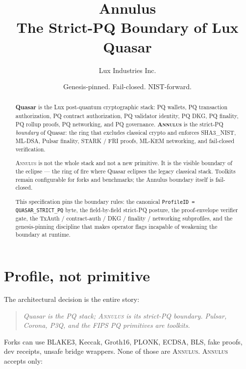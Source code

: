 \documentclass[11pt,a4paper]{article}
\title{Annulus\\
       \large The Strict-PQ Boundary of Lux Quasar}
\author{Lux Industries Inc.}
\date{Genesis-pinned. Fail-closed. NIST-forward.}
\newcommand{\Annulus}{\textsc{Annulus}}
\newcommand{\PQ}{\textsf{PQ}}
\begin{document}
\maketitle

\begin{abstract}
\textbf{Quasar} is the Lux post-quantum cryptographic stack:
\PQ{} wallets, \PQ{} transaction authorization, \PQ{} contract
authorization, \PQ{} validator identity, \PQ{} DKG, \PQ{} finality,
\PQ{} rollup proofs, \PQ{} networking, and \PQ{} governance.
\textbf{\Annulus{}} is the strict-PQ \emph{boundary} of Quasar:
the ring that excludes classical crypto and enforces SHA3\_NIST,
ML-DSA, Pulsar finality, STARK / FRI proofs, ML-KEM networking,
and fail-closed verification.

\Annulus{} is not the whole stack and not a new primitive. It is
the visible boundary of the eclipse --- the ring of fire where
Quasar eclipses the legacy classical stack. Toolkits remain
configurable for forks and benchmarks; the Annulus boundary
itself is fail-closed.

This specification pins the boundary rules: the canonical
\texttt{ProfileID = QUASAR\_STRICT\_PQ} byte, the field-by-field
strict-PQ posture, the proof-envelope verifier gate, the
TxAuth / contract-auth / DKG / finality / networking subprofiles,
and the genesis-pinning discipline that makes operator flags
incapable of weakening the boundary at runtime.
\end{abstract}

\tableofcontents

\section{Profile, not primitive}
\label{sec:profile}

The architectural decision is the entire story:

\begin{quote}
\emph{Quasar is the PQ stack; \Annulus{} is its strict-PQ
boundary. Pulsar, Corona, P3Q, and the FIPS PQ primitives are
toolkits.}
\end{quote}

Forks can use BLAKE3, Keccak, Groth16, PLONK, ECDSA, BLS, fake
proofs, dev receipts, unsafe bridge wrappers. None of those are
\Annulus{}. \Annulus{} accepts only:
\end{document}
